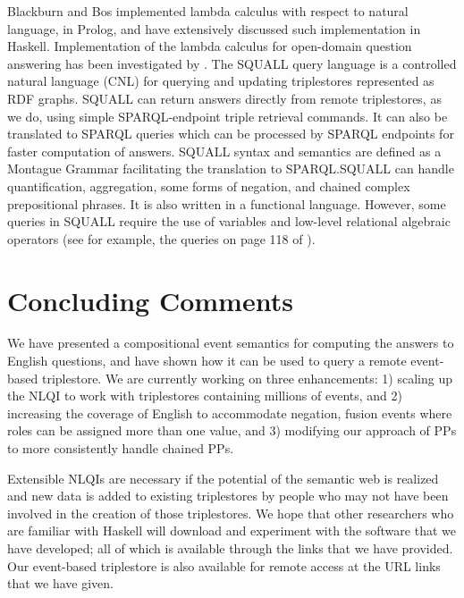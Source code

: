 \documentclass[../main.tex]{subfiles}
\begin{document}
\begin{refsection}
Blackburn and Bos \cite{blackburn2005representation} implemented lambda calculus with respect to natural language, in
Prolog, and \cite{van2010computational} have extensively discussed such implementation in
Haskell. Implementation of the lambda calculus for open-domain question answering has been
investigated by \cite{ahn2005question}.
The SQUALL query language \cite{ferre:squall,ferre2013squall} is a controlled natural language
(CNL) for querying and updating triplestores represented as RDF graphs. SQUALL can return
answers directly from remote triplestores, as we do, using simple SPARQL-endpoint triple
retrieval commands. It can also be translated to SPARQL queries which can be processed by
SPARQL endpoints for faster computation of answers. SQUALL syntax and semantics are
defined as a Montague Grammar facilitating the translation to SPARQL.SQUALL can handle
quantification, aggregation, some forms of negation, and chained complex prepositional phrases.
It is also written in a functional language. However, some queries in SQUALL require the use of
variables and low-level relational algebraic operators (see for example, the queries on page 118
of \cite{ferre2013squall}).

\section{Concluding Comments}
\label{ext:conclusion}
We have presented a compositional event semantics for computing the answers to English questions,
and have shown how it can be used to query a remote event-based triplestore. We are currently
working on three enhancements: 1) scaling up the NLQI to work with triplestores containing millions of
events, and 2) increasing the coverage of English to accommodate negation, fusion events where roles
can be assigned more than one value, and 3) modifying our approach of PPs to more
consistently handle chained PPs.

Extensible NLQIs are necessary if the potential of the semantic web is realized and new data is added
to existing triplestores by people who may not have been involved in the creation of those triplestores.
We hope that other researchers who are familiar with Haskell will download and experiment with the
software that we have developed; all of which is available through the links that we have provided. Our
event-based triplestore is also available for remote access at the URL
links that we have given.


\end{refsection}
\end{document}
